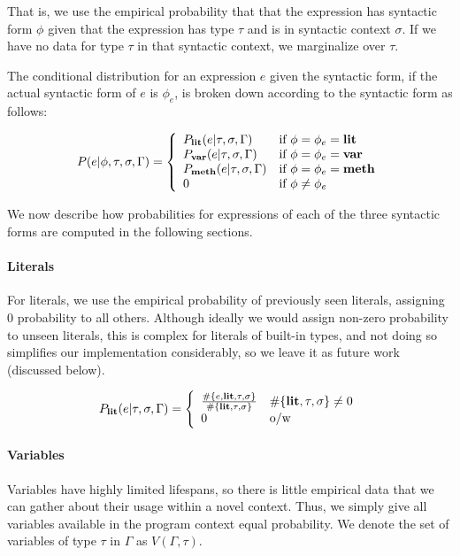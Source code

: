 \documentclass{article} %
\begin{document}
  That is, we use the empirical probability that that the expression has syntactic form $\phi$ given that the expression has type $\tau$ and is in syntactic context $\sigma$. If we have no data for type $\tau$ in that syntactic context, we marginalize over $\tau$.
  
  The conditional distribution for an expression $e$ given the syntactic form, if the actual syntactic form of $e$ is $\phi_e$, is broken down according to the syntactic form as follows:
  
$$P(e | \phi, \tau, \sigma, \Gamma) =
\left\{
	\begin{array}{ll}
		P_{\textbf{lit}}(e | \tau, \sigma, \Gamma) & \mbox{if } \phi = \phi_e = \textbf{lit}\\
		P_{\textbf{var}}(e | \tau, \sigma, \Gamma) & \mbox{if } \phi = \phi_e = \textbf{var}\\
		P_{\textbf{meth}}(e | \tau, \sigma, \Gamma) & \mbox{if } \phi = \phi_e = \textbf{meth}\\
		0  & \mbox{if } \phi \neq \phi_e 
	\end{array}
\right.
$$

We now describe how probabilities for expressions of each of the three syntactic forms are computed in the following sections. 

\paragraph{Literals}
For literals, we use the empirical probability of previously seen literals, assigning 0 probability to all others. Although ideally we would assign non-zero probability to unseen literals, this is complex for literals of built-in types, and not doing so simplifies our implementation considerably, so we leave it as future work (discussed below).

$$P_{\textbf{lit}}(e | \tau, \sigma, \Gamma) = 
\left\{
	\begin{array}{ll}
		\frac{\#\{e, \textbf{lit}, \tau, \sigma\}}{\#\{\textbf{lit}, \tau, \sigma\}} & \#\{\textbf{lit}, \tau, \sigma\} \neq 0\\
		0 & \mbox{o/w}
	\end{array}
\right.$$

\paragraph{Variables} Variables have highly limited lifespans, so there is little empirical data that we can gather about their usage within a novel context. Thus, we simply give all variables available in the program context equal probability. We denote the set of variables of type $\tau$ in $\Gamma$ as $V(\Gamma, \tau)$.
\end{document}
